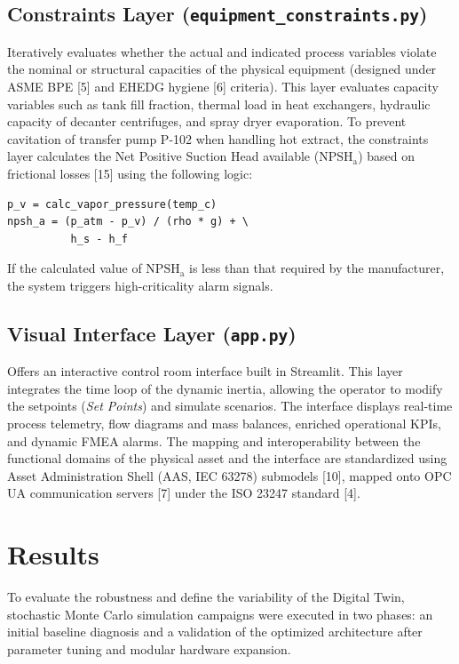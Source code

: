 \documentclass[10pt,letterpaper,twocolumn]{article}
\begin{document}
\subsection{Constraints Layer (\texttt{equipment\_constraints.py})}
Iteratively evaluates whether the actual and indicated process variables violate the nominal or structural capacities of the physical equipment (designed under ASME BPE [5] and EHEDG hygiene [6] criteria). This layer evaluates capacity variables such as tank fill fraction, thermal load in heat exchangers, hydraulic capacity of decanter centrifuges, and spray dryer evaporation. To prevent cavitation of transfer pump P-102 when handling hot extract, the constraints layer calculates the Net Positive Suction Head available ($\mathrm{NPSH}_{\mathrm{a}}$) based on frictional losses [15] using the following logic:
\begin{verbatim}
p_v = calc_vapor_pressure(temp_c)
npsh_a = (p_atm - p_v) / (rho * g) + \
          h_s - h_f
\end{verbatim}
If the calculated value of $\mathrm{NPSH}_{\mathrm{a}}$ is less than that required by the manufacturer, the system triggers high-criticality alarm signals.

\subsection{Visual Interface Layer (\texttt{app.py})}
Offers an interactive control room interface built in Streamlit. This layer integrates the time loop of the dynamic inertia, allowing the operator to modify the setpoints (\textit{Set Points}) and simulate scenarios. The interface displays real-time process telemetry, flow diagrams and mass balances, enriched operational KPIs, and dynamic FMEA alarms. The mapping and interoperability between the functional domains of the physical asset and the interface are standardized using Asset Administration Shell (AAS, IEC 63278) submodels [10], mapped onto OPC UA communication servers [7] under the ISO 23247 standard [4].

\section{Results}

To evaluate the robustness and define the variability of the Digital Twin, stochastic Monte Carlo simulation campaigns were executed in two phases: an initial baseline diagnosis and a validation of the optimized architecture after parameter tuning and modular hardware expansion.
\end{document}
